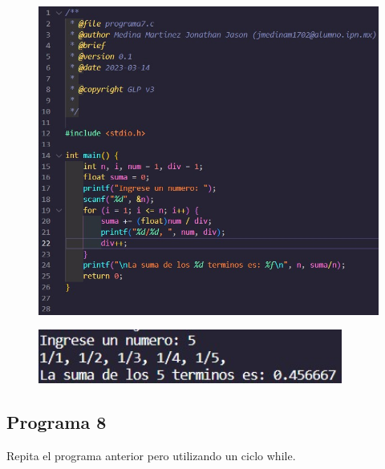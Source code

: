 \documentclass{article}
\begin{document}
\begin{figure}[H]
    \centering
    \includegraphics[width = 15cm]{img7a.jpg}
\end{figure}
\begin{figure}[H]
    \centering
    \includegraphics[width = 10cm]{img7b.jpg}
\end{figure}
\newpage
\subsection{Programa 8}

Repita el programa anterior pero utilizando un ciclo while.
\end{document}
